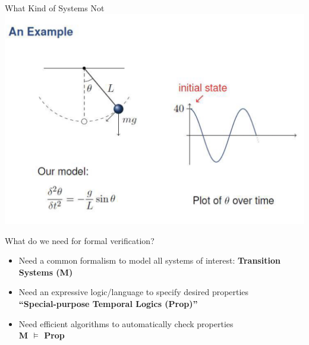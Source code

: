 \documentclass{beamer}
\begin{document}
\begin{frame}{What Kind of Systems Not} 
\includegraphics[scale=0.3]{pics/contdynamics.png}
\end{frame}

\begin{frame}{What do we need for formal verification?}
\begin{itemize}
\item<1-> Need a common formalism to model all systems of interest:
\textbf{Transition Systems (M)}

\item<2-> Need an expressive logic/language to specify desired properties \\
\textbf{``Special-purpose Temporal Logics (Prop)''}

\item<3-> Need efficient algorithms to automatically check properties \\
\textbf{M $\models$ Prop}
\end{itemize}
\end{frame}
\end{document}
